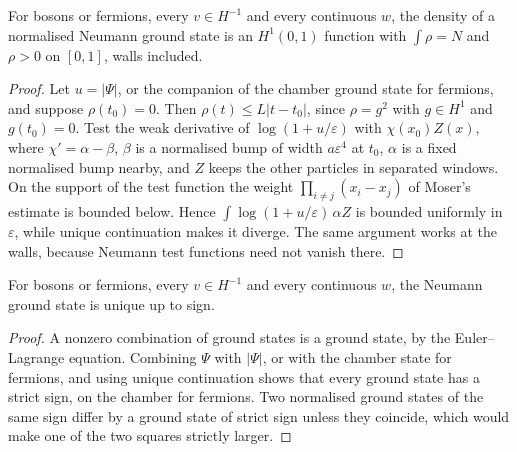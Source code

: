 \begin{theorem}
  \label{thm:neu_pos}
  \leanok
  For bosons or fermions, every $v\in H^{-1}$ and every continuous $w$, the density of a normalised Neumann ground state
  is an $H^1(0,1)$ function with $\int\rho=N$ and $\rho>0$ on $[0,1]$, walls included.
\end{theorem}
\begin{proof}
  \leanok
  Let $u=|\Psi|$, or the companion of the chamber ground state for fermions, and suppose $\rho(t_0)=0$. Then
  $\rho(t)\le L|t-t_0|$, since $\rho=g^2$ with $g\in H^1$ and $g(t_0)=0$. Test the weak derivative of $\log(1+u/\varepsilon)$
  with $\chi(x_0)Z(x)$, where $\chi'=\alpha-\beta$, $\beta$ is a normalised bump of width $a\varepsilon^4$ at $t_0$, $\alpha$ is a
  fixed normalised bump nearby, and $Z$ keeps the other particles in separated windows. On the support of the test
  function the weight $\prod_{i\ne j}(x_i-x_j)$ of Moser's estimate is bounded below. Hence $\int\log(1+u/\varepsilon)\,\alpha Z$
  is bounded uniformly in $\varepsilon$, while unique continuation makes it diverge. The same argument works at the walls,
  because Neumann test functions need not vanish there.
\end{proof}

\begin{theorem}
  \label{thm:neu_nondeg}
  \leanok
  For bosons or fermions, every $v\in H^{-1}$ and every continuous $w$, the Neumann ground state is unique up to sign.
\end{theorem}
\begin{proof}
  \leanok
  A nonzero combination of ground states is a ground state, by the Euler--Lagrange equation. Combining $\Psi$ with $|\Psi|$,
  or with the chamber state for fermions, and using unique continuation shows that every ground state has a strict
  sign, on the chamber for fermions. Two normalised ground states of the same sign differ by a ground state of strict
  sign unless they coincide, which would make one of the two squares strictly larger.
\end{proof}

